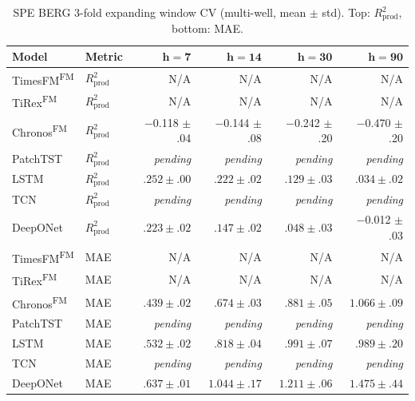 \documentclass[11pt]{article}
\newcommand{\best}[1]{\textbf{#1}}
\newcommand{\fm}{\textsuperscript{FM}}
\newcommand{\rp}{R^2_\text{prod}}
\begin{document}
\begin{table}[ht]
\centering
\caption{SPE BERG 3-fold expanding window CV (multi-well, mean $\pm$ std). Top: $\rp$, bottom: MAE.}
\label{tab:spe_berg_cv}
\scriptsize
\setlength{\tabcolsep}{2.5pt}
\begin{tabular}{@{}ll rrrr @{}}
\toprule
\textbf{Model} & \textbf{Metric} & $\boldsymbol{h{=}7}$ & $\boldsymbol{h{=}14}$ & $\boldsymbol{h{=}30}$ & $\boldsymbol{h{=}90}$ \\
\midrule
TimesFM\fm    & $\rp$ & N/A & N/A & N/A & N/A \\
TiRex\fm      & $\rp$ & N/A & N/A & N/A & N/A \\
Chronos\fm    & $\rp$ & $-$0.118 $\pm$ .04 & $-$0.144 $\pm$ .08 & $-$0.242 $\pm$ .20 & $-$0.470 $\pm$ .20 \\
PatchTST      & $\rp$ & \textit{pending} & \textit{pending} & \textit{pending} & \textit{pending} \\
LSTM          & $\rp$ & \best{$.252 \pm .00$} & \best{$.222 \pm .02$} & \best{$.129 \pm .03$} & \best{$.034 \pm .02$} \\
TCN           & $\rp$ & \textit{pending} & \textit{pending} & \textit{pending} & \textit{pending} \\
DeepONet      & $\rp$ & $.223 \pm .02$ & $.147 \pm .02$ & $.048 \pm .03$ & $-$0.012 $\pm$ .03 \\
\midrule
TimesFM\fm    & MAE & N/A & N/A & N/A & N/A \\
TiRex\fm      & MAE & N/A & N/A & N/A & N/A \\
Chronos\fm    & MAE & \best{$.439 \pm .02$} & \best{$.674 \pm .03$} & \best{$.881 \pm .05$} & $1.066 \pm .09$ \\
PatchTST      & MAE & \textit{pending} & \textit{pending} & \textit{pending} & \textit{pending} \\
LSTM          & MAE & $.532 \pm .02$ & $.818 \pm .04$ & $.991 \pm .07$ & \best{$.989 \pm .20$} \\
TCN           & MAE & \textit{pending} & \textit{pending} & \textit{pending} & \textit{pending} \\
DeepONet      & MAE & $.637 \pm .01$ & $1.044 \pm .17$ & $1.211 \pm .06$ & $1.475 \pm .44$ \\
\bottomrule
\end{tabular}
\end{table}
\end{document}
